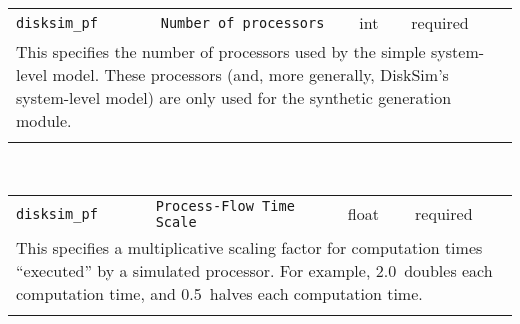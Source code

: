 \noindent 
\begin{tabular}{|p{\lpmodwidth}|p{\lpnamewidth}|p{0.5in}|p{0.5in}|}
\cline{1-4}
\texttt{disksim\_pf} & \texttt{Number of processors} & int & required \\ 
\cline{1-4}
\multicolumn{4}{|p{6in}|}{
This specifies the number of processors used by the simple system-level
model. These processors (and, more generally, DiskSim's system-level
model) are only used for the synthetic generation module.
}\\ 
\cline{1-4}
\multicolumn{4}{p{5in}}{}\\
\end{tabular}\\ 
\noindent 
\begin{tabular}{|p{\lpmodwidth}|p{\lpnamewidth}|p{0.5in}|p{0.5in}|}
\cline{1-4}
\texttt{disksim\_pf} & \texttt{Process-Flow Time Scale} & float & required \\ 
\cline{1-4}
\multicolumn{4}{|p{6in}|}{
This specifies a multiplicative scaling factor for computation times
``executed'' by a simulated processor. For example, 2.0~doubles each
computation time, and 0.5~halves each computation time.
}\\ 
\cline{1-4}
\multicolumn{4}{p{5in}}{}\\
\end{tabular}\\ 
